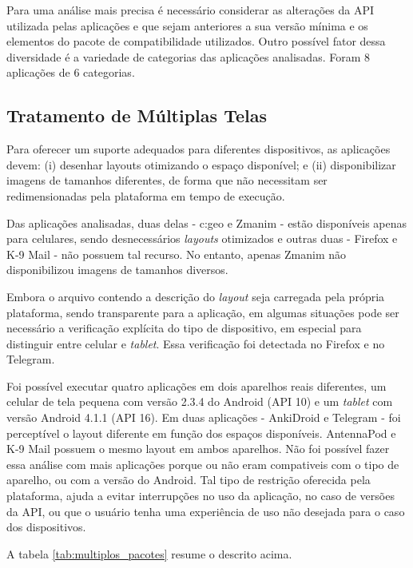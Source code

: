 Para uma análise mais precisa é necessário considerar as alterações da API
utilizada pelas aplicações e que sejam anteriores a sua versão mínima e os
elementos do pacote de compatibilidade utilizados. Outro possível fator dessa
diversidade é a variedade de categorias das aplicações analisadas. Foram 8
aplicações de 6 categorias.

\subsection{Tratamento de Múltiplas Telas}
\label{sec:multiplas_telas}

Para oferecer um suporte adequados para diferentes dispositivos, as aplicações
devem: (i) desenhar layouts otimizando o espaço disponível; e (ii) disponibilizar
imagens de tamanhos diferentes, de forma que não necessitam ser redimensionadas
pela plataforma em tempo de execução.

Das aplicações analisadas, duas delas - c:geo e Zmanim - estão disponíveis apenas
para celulares, sendo desnecessários \textit{layouts} otimizados e outras duas - Firefox
e K-9 Mail - não possuem tal recurso. No entanto, apenas Zmanim não disponibilizou
imagens de tamanhos diversos.

Embora o arquivo contendo a descrição do \textit{layout} seja carregada pela própria
plataforma, sendo transparente para a aplicação, em algumas situações pode ser
necessário a verificação explícita do tipo de dispositivo, em especial para
distinguir entre celular e \textit{tablet}. Essa verificação foi detectada no Firefox
e no Telegram.

Foi possível executar quatro aplicações em dois aparelhos reais diferentes,
um celular de tela pequena com versão 2.3.4 do Android (API 10) e um \textit{tablet} com
versão Android 4.1.1 (API 16). Em duas aplicações - AnkiDroid e Telegram  - foi perceptível
o layout diferente em função dos espaços disponíveis. AntennaPod e K-9 Mail possuem
o mesmo layout em ambos aparelhos. Não foi possível fazer essa análise com mais
aplicações porque ou não eram compativeis com o tipo de aparelho, ou com a versão
do Android. Tal tipo de restrição oferecida pela plataforma, ajuda a evitar
interrupções no uso da aplicação, no caso de versões da API, ou que o usuário
tenha uma experiência de uso não desejada para o caso dos dispositivos.

A tabela \ref{tab:multiplos_pacotes} resume o descrito acima.

